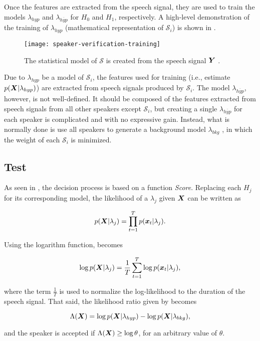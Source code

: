 Once the features are extracted from the speech signal, they are used to train the models $\lambda_{hyp}$ and $\lambda_{\overline{hyp}}$ for $H_0$ and $H_1$, respectively. A high-level demonstration of the training of $\lambda_{hyp}$ (mathematical representation of $\mathcal{S}_i$) is shown in .

\begin{figure}[ht]
    \centering
    \texttt{[image: speaker-verification-training]}
    \caption{The statistical model of $\mathcal{S}$ is created from the speech signal $\boldsymbol{Y}$ .}
    \label{fig:speaker-verification-training}
\end{figure}

Due to $\lambda_{hyp}$ be a model of $\mathcal{S}_i$, the features used for training (i.e., estimate $p(\boldsymbol{X}|\lambda_{hyp})$) are extracted from speech signals produced by $\mathcal{S}_i$. The model $\lambda_{\overline{hyp}}$, however, is not well-defined. It should be composed of the features extracted from speech signals from all other speakers except $\mathcal{S}_i$, but creating a single $\lambda_{\overline{hyp}}$ for each speaker is complicated and with no expressive gain. Instead, what is normally done is use all speakers to generate a background model $\lambda_{bkg}$ , in which the weight of each $\mathcal{S}_i$ is minimized.

\subsection{Test}

As seen in , the decision process is based on a function \emph{Score}. Replacing each $H_j$ for its corresponding model, the likelihood of a $\lambda_j$ given $\boldsymbol{X}$ can be written as

\begin{equation}
    p(\dvec{X}|\lambda_j) = \prod_{t=1}^T p(\dvec{x}_t|\lambda_j).
    \label{eq:likelihood-prod}
\end{equation}

\noindent Using the logarithm function,  becomes

\begin{equation}
    \log p(\dvec{X}|\lambda_j) = \frac{1}{T} \sum_{t=1}^T \log p(\dvec{x}_t|\lambda_j),
    \label{eq:log-likelihood-sum}
\end{equation}

\noindent where the term $\frac{1}{T}$ is used to normalize the log-likelihood to the duration of the speech signal. That said, the likelihood ratio given by  becomes

\begin{equation}
    \Lambda(\dvec{X}) = \log p(\dvec{X}|\lambda_{hyp}) - \log p(\dvec{X}|\lambda_{bkg}),
    \label{eq:score_of_X}
\end{equation}

\noindent and the speaker is accepted if $\Lambda(\boldsymbol{X}) \geq \log \theta$, for an arbitrary value of $\theta$.